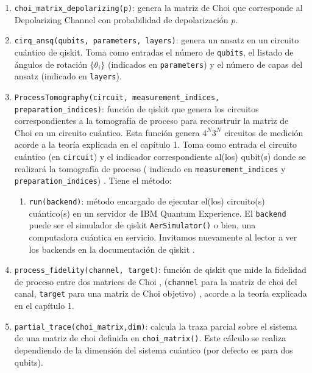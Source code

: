 \documentclass[letterpaper,12pt]{thesisECFM}
\theoremstyle{plain}
\theoremstyle{definition}
\theoremstyle{remark}
\newcommand{\1}{\mathbb{1}}
\begin{document}
\begin{enumerate}
    \item \texttt{choi\_matrix\_depolarizing(p)}: genera la matriz de Choi que corresponde al Depolarizing Channel con probabilidad de depolarización $p$.

    \item \texttt{cirq\_ansq(qubits, parameters, layers)}: genera un ansatz en un circuito cuántico de qiskit. Toma como entradas el número de \texttt{qubits}, el listado de ángulos de rotación $\{\theta_i\}$ (indicados en \texttt{parameters}) y el número de capas del ansatz (indicado en \texttt{layers}).

    \item \texttt{ProcessTomography(circuit, measurement\_indices, preparation\_indices)}: función de qiskit que genera los circuitos correspondientes a la tomografía de proceso para reconstruir la matriz de Choi en un circuito cuántico. Esta función genera $4^N3^N$ circuitos de medición acorde a la teoría explicada en el capítulo 1. Toma como entrada el circuito cuántico (en  \texttt{circuit})  y el indicador correspondiente al(los) qubit(s) donde se realizará la tomografía de proceso ( indicado en \texttt{measurement\_indices} y \texttt{preparation\_indices}) . Tiene el método:
    \begin{enumerate}
        \item \texttt{run(backend)}: método encargado de ejecutar el(los) circuito(s) cuántico(s) en un servidor de IBM Quantum Experience. El \texttt{backend} puede ser el simulador de qiskit  \texttt{AerSimulator()} o bien, una computadora cuántica en servicio. Invitamos nuevamente al lector a ver los backends en la documentación de qiskit \cite{qiskit_documentation}. 
    \end{enumerate}

    

    \item \texttt{process\_fidelity(channel, target)}: función de qiskit que mide la fidelidad de proceso entre dos matrices de Choi , (\texttt{channel} para la matriz de choi del canal, \texttt{target} para una matriz de Choi objetivo) \cite{qiskit_documentation}, acorde a la teoría explicada en el capítulo 1.

    \item \texttt{partial\_trace(choi\_matrix,dim)}: calcula la traza parcial sobre el sistema de una matriz de choi definida en \texttt{choi\_matrix()}. Este cálculo se realiza dependiendo de la dimensión del sistema cuántico (por defecto es para dos qubits).
    

\end{enumerate}
\end{document}
